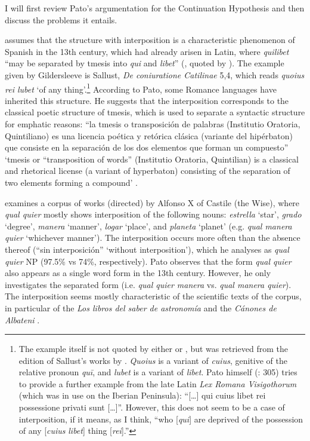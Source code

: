   I will first review Pato’s argumentation for the Continuation Hypothesis and then discuss the problems it entails.

  \citet{Pato2012} assumes that the structure with interposition is a characteristic phenomenon of Spanish in the 13th century, which had already arisen in Latin, where \textit{quilibet} “may be separated by tmesis into \textit{qui} and \textit{libet}” (\cite[62]{GildersleeveLodge1900}, quoted by \cite[304]{Pato2012}). The example given by Gildersleeve is Sallust, \textit{De coniuratione Catilinae} 5,4, which reads \textit{quoius rei lubet} ‘of any thing’.\footnote{The example itself is not quoted by either \citeauthor{GildersleeveLodge1900} or \citeauthor{Pato2012}, but was retrieved from the edition of Sallust’s works by \citet[5]{Ahlberg1919}. \textit{Quoius} is a variant of \textit{cuius}, genitive of the relative pronoun \textit{quī}, and \textit{lubet} is a variant of \textit{libet}. {Pato himself (\citeyear{Pato2012}: 305) tries to provide a further example from the late Latin}{} \textit{Lex Romana Visigothorum} (which was in use on the Iberian Peninsula): “[…] qui cuius libet rei possessione privati sunt […]”. However, this does not seem to be a case of interposition, if it means, as I think, “who [\textit{qui}] are deprived of the possession of any [\textit{cuius} \textit{libet}] thing [\textit{rei}].”} According to Pato, some Romance languages have inherited this structure. He suggests that the interposition corresponds to the classical poetic structure of tmesis, which is used to separate a syntactic structure for emphatic reasons: “la tmesis o \guillemotleft transposición de palabras\guillemotright{}
  (Institutio Oratoria, Quintiliano) es una licencia poética y retórica clásica (variante del hipérbaton) que consiste en la separación de los dos elementos que forman un compuesto”  ‘tmesis or “transposition of words” (Institutio Oratoria, Quintilian) is a classical and rhetorical license (a variant of hyperbaton) consisting of the separation of two elements forming a compound’ \citep[280]{Pato2012}.

  \citet{Pato2012} examines a corpus of works (directed) by Alfonso X of Castile (the Wise), where \textit{qual quier} mostly shows interposition of the following nouns: \textit{estrella} ‘star’, \textit{grado} ‘degree’, \textit{manera} ‘manner’, \textit{logar} ‘place’, and \textit{planeta} ‘planet’ (e.g. \textit{qual manera quier} ‘whichever manner’). The interposition occurs more often than the absence thereof (“sin interposición” ‘without interposition’), which he analyses as \textit{qual quier} NP (97.5\% vs 74\%, respectively). Pato observes that the form \textit{qual quier} also appears as a single word form in the 13th century. However, he only investigates the separated form  (i.e. \textit{qual quier manera} vs. \textit{qual manera quier}). The interposition seems mostly characteristic of the scientific texts of the corpus, in particular of the \textit{Los libros del saber de astronomía} and the \textit{Cánones de Albateni} \citep[301]{Pato2012}.


